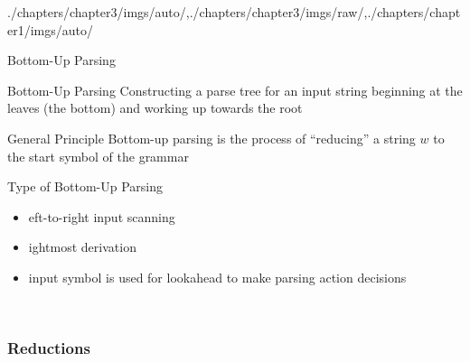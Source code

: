 \begin{graphicspathcontext}{{./chapters/chapter3/imgs/auto/},{./chapters/chapter3/imgs/raw/},{./chapters/chapter1/imgs/auto/}}
\begin{bibunit}[apalike]
\begin{frame}{Bottom-Up Parsing}
	\begin{definitionblock}{Bottom-Up Parsing}
		Constructing a parse tree for an input string beginning at the leaves (the bottom) and working up towards the root
	\end{definitionblock}
	\vspace{.5cm}
	\begin{block}{General Principle}
		Bottom-up parsing is the process of ``reducing'' a string $w$ to the start symbol of the grammar
	\end{block}
\end{frame}

\begin{frame}{Type of Bottom-Up Parsing}
	\centering{}
	\hspace{2cm}
	\begin{minipage}[b]{.4\linewidth}
			\begin{itemize}
			\item {\Large{}}eft-to-right input scanning
			\item {\Large{}}ightmost derivation
			\item {\Large{}} input symbol is used for lookahead to make parsing action decisions
		\end{itemize}
	\end{minipage} \\[.25cm]
\end{frame}

\subsubsection{Reductions}
\subsubsectiontableofcontentslide


\end{bibunit}
\end{graphicspathcontext}
